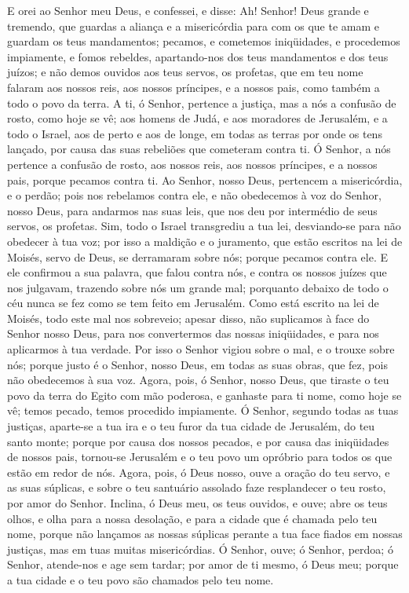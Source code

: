 E orei ao Senhor meu Deus, e confessei, e disse: Ah! Senhor! Deus
grande e tremendo, que guardas a aliança e a misericórdia para com
os que te amam e guardam os teus mandamentos; pecamos, e
cometemos iniqüidades, e procedemos impiamente, e fomos rebeldes,
apartando-nos dos teus mandamentos e dos teus juízos; e não
demos ouvidos aos teus servos, os profetas, que em teu nome falaram
aos nossos reis, aos nossos príncipes, e a nossos pais, como também
a todo o povo da terra. A ti, ó Senhor, pertence a justiça, mas
a nós a confusão de rosto, como hoje se vê; aos homens de Judá, e
aos moradores de Jerusalém, e a todo o Israel, aos de perto e aos de
longe, em todas as terras por onde os tens lançado, por causa das
suas rebeliões que cometeram contra ti. Ó Senhor, a nós pertence
a confusão de rosto, aos nossos reis, aos nossos príncipes, e a
nossos pais, porque pecamos contra ti. Ao Senhor, nosso Deus,
pertencem a misericórdia, e o perdão; pois nos rebelamos contra ele,
e não obedecemos à voz do Senhor, nosso Deus, para andarmos
nas suas leis, que nos deu por intermédio de seus servos, os
profetas. Sim, todo o Israel transgrediu a tua lei,
desviando-se para não obedecer à tua voz; por isso a maldição e o
juramento, que estão escritos na lei de Moisés, servo de Deus, se
derramaram sobre nós; porque pecamos contra ele. E ele
confirmou a sua palavra, que falou contra nós, e contra os nossos
juízes que nos julgavam, trazendo sobre nós um grande mal; porquanto
debaixo de todo o céu nunca se fez como se tem feito em Jerusalém.
Como está escrito na lei de Moisés, todo este mal nos
sobreveio; apesar disso, não suplicamos à face do Senhor nosso Deus,
para nos convertermos das nossas iniqüidades, e para nos aplicarmos
à tua verdade. Por isso o Senhor vigiou sobre o mal, e o
trouxe sobre nós; porque justo é o Senhor, nosso Deus, em todas as
suas obras, que fez, pois não obedecemos à sua voz. Agora,
pois, ó Senhor, nosso Deus, que tiraste o teu povo da terra do Egito
com mão poderosa, e ganhaste para ti nome, como hoje se vê; temos
pecado, temos procedido impiamente. Ó Senhor, segundo todas
as tuas justiças, aparte-se a tua ira e o teu furor da tua cidade de
Jerusalém, do teu santo monte; porque por causa dos nossos pecados,
e por causa das iniqüidades de nossos pais, tornou-se Jerusalém e o
teu povo um opróbrio para todos os que estão em redor de nós.
Agora, pois, ó Deus nosso, ouve a oração do teu servo, e as
suas súplicas, e sobre o teu santuário assolado faze resplandecer o
teu rosto, por amor do Senhor. Inclina, ó Deus meu, os teus
ouvidos, e ouve; abre os teus olhos, e olha para a nossa desolação,
e para a cidade que é chamada pelo teu nome, porque não lançamos as
nossas súplicas perante a tua face fiados em nossas justiças, mas em
tuas muitas misericórdias. Ó Senhor, ouve; ó Senhor, perdoa;
ó Senhor, atende-nos e age sem tardar; por amor de ti mesmo, ó Deus
meu; porque a tua cidade e o teu povo são chamados pelo teu nome.

